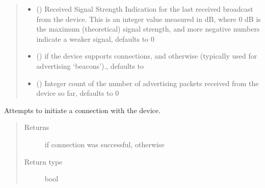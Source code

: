 \documentclass[letterpaper,10pt,english]{sphinxmanual}
\begin{document}
\begin{fulllineitems}
\begin{quote}
\begin{description}
\begin{itemize}
\item {} 
 (\sphinxstyleliteralemphasis{\sphinxupquote{, }}) \textendash{} Received Signal Strength Indication for the last received broadcast from the device. This is an integer value measured in dB, where 0 dB is the maximum (theoretical) signal strength, and more negative numbers indicate a weaker signal, defaults to 0

\item {} 
 (\sphinxstyleliteralemphasis{\sphinxupquote{, }}) \textendash{}  if the device supports connections, and  otherwise (typically used for advertising ‘beacons’)., defaults to 

\item {} 
 (\sphinxstyleliteralemphasis{\sphinxupquote{, }}) \textendash{} Integer count of the number of advertising packets received from the device so far, defaults to 0

\end{itemize}

\end{description}\end{quote}

\begin{fulllineitems}
\label{\detokenize{PandaBot:PandaBot.PandaBotDevice.connect}}
Attempts to initiate a connection with the device.
\begin{quote}\begin{description}
\item[{Returns}] \leavevmode
{} if connection was successful,  otherwise

\item[{Return type}] \leavevmode
bool

\end{description}\end{quote}

\end{fulllineitems}


\end{fulllineitems}
\end{document}
